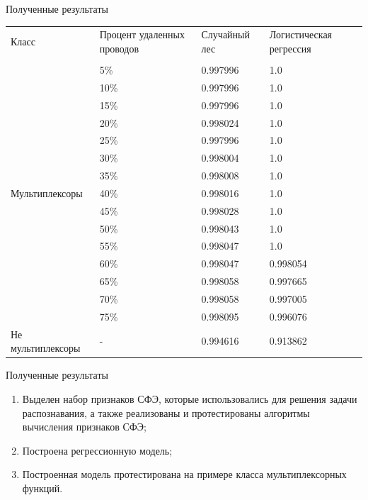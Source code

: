 \documentclass[serif,utf8]{beamer}
\begin{document}
\begin{frame}{Полученные результаты}
\scriptsize{
\begin{table}[h!]
\begin{tabular}[t]{|p{8em}|p{6em}|p{6em}|p{7em}|}
\hline 
	{Класс} & { Процент удаленных проводов} & { Случайный лес } & { Логистическая регрессия }\\
	{} & {  } & { } & { }\\
\hline
\hline
\hline
	\multirow{15}{*}{Мультиплексоры} 
		& {5\%}  & {0.997996} & {1.0}\\ \cline{2-4}
		& {10\%} & {0.997996} & {1.0}\\ \cline{2-4}
		& {15\%} & {0.997996} & {1.0}\\ \cline{2-4}
		& {20\%} & {0.998024} & {1.0}\\ \cline{2-4}
		& {25\%} & {0.997996} & {1.0}\\ \cline{2-4}
		& {30\%} & {0.998004} & {1.0}\\ \cline{2-4}
		& {35\%} & {0.998008} & {1.0}\\ \cline{2-4}
		& {40\%} & {0.998016} & {1.0}\\ \cline{2-4}
		& {45\%} & {0.998028} & {1.0}\\ \cline{2-4}
		& {50\%} & {0.998043} & {1.0}\\ \cline{2-4}
		& {55\%} & {0.998047} & {1.0}\\ \cline{2-4}
		& {60\%} & {0.998047} & {0.998054}\\ \cline{2-4}
		& {65\%} & {0.998058} & {0.997665}\\ \cline{2-4}
		& {70\%} & {0.998058} & {0.997005}\\ \cline{2-4}
		& {75\%} & {0.998095} & {0.996076}\\
\hline
\hline
	{Не мультиплексоры} & { - } & {0.994616} & {0.913862}\\ \cline{1-4}
\hline
\end{tabular}
\end{table}
}
\end{frame}


\begin{frame}{Полученные результаты}
\begin{enumerate}
[default]
\item Выделен набор признаков СФЭ, которые использовались для решения задачи распознавания, а также реализованы и протестированы алгоритмы вычисления признаков СФЭ;
\item Построена регрессионную модель;
\item Построенная модель протестирована на примере класса мультиплексорных функций. 
\end{enumerate}
\end{frame}

\begin{frame}
\maketitle
\end{frame}
\end{document}
